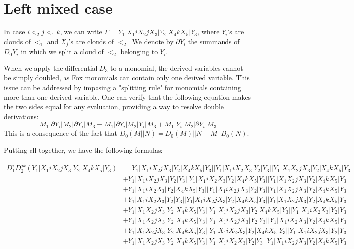 \documentclass{article}[12pt]
\begin{document}
\section*{Left mixed case}
In case $i<_2 j <_1 k$, we can write  $\Gamma = Y_1|X_1 i X_2 j X_3 |Y_2|X_4 k X_5 | Y_3$, where $Y_i$'s are clouds of $<_1$ and $X_j$'s are clouds of $<_2$. We denote by $\partial Y_i$ the summands of $D_0 Y_i$ in which we split a cloud of $<_2$ belonging to $Y_i$.

When we apply the differential $D_3$ to a monomial, the derived variables cannot be simply doubled, as Fox monomials can contain only one derived variable. This issue can be addressed by imposing a "splitting rule" for monomials containing more than one derived variable. One can verify that the following equation makes the two sides equal for any evaluation, providing a way to resolve double derivations:
$$ M_1|\partial Y_i | M_2 | \partial Y_i |M_3 = M_1|\partial Y_i | M_2 | Y_i |M_3 + M_1|Y_i | M_2 | \partial Y_i |M_3 $$
This is a consequence of the fact that $D_0(M||N)=D_0(M)||N + M||D_0(N)$. 

Putting all together, we have the following formulas:

\begin{align*}
D_1^iD_2^{jk}(Y_1|X_1iX_2jX_3|Y_2|X_4kX_5|Y_3)& =Y_1|X_1iX_2jX_3|Y_2|X_4kX_5|Y_3||Y_1|X_1iX_2X_3|Y_2|Y_3||Y_1|X_1X_2jX_3|Y_2|X_4kX_5|Y_3\\ 
 & +Y_1|X_1iX_2jX_3|Y_2|Y_3||Y_1|X_1iX_2X_3|Y_2|X_4kX_5|Y_3||Y_1|X_1X_2jX_3|Y_2|X_4kX_5|Y_3\\ 
 & +Y_1|X_1iX_2X_3|Y_2|X_4kX_5|Y_3||Y_1|X_1iX_2jX_3|Y_2|Y_3||Y_1|X_1X_2jX_3|Y_2|X_4kX_5|Y_3\\ 
 & +Y_1|X_1iX_2X_3|Y_2|Y_3||Y_1|X_1iX_2jX_3|Y_2|X_4kX_5|Y_3||Y_1|X_1X_2jX_3|Y_2|X_4kX_5|Y_3\\ 
 & +Y_1|X_1X_2jX_3|Y_2|X_4kX_5|Y_3||Y_1|X_1iX_2jX_3|Y_2|X_4kX_5|Y_3||Y_1|X_1iX_2X_3|Y_2|Y_3\\ 
 & +Y_1|X_1X_2jX_3|Y_2|X_4kX_5|Y_3||Y_1|X_1iX_2jX_3|Y_2|Y_3||Y_1|X_1iX_2X_3|Y_2|X_4kX_5|Y_3\\ 
 & +Y_1|X_1X_2jX_3|Y_2|X_4kX_5|Y_3||Y_1|X_1iX_2X_3|Y_2|X_4kX_5|Y_3||Y_1|X_1iX_2jX_3|Y_2|Y_3\\ 
 & +Y_1|X_1X_2jX_3|Y_2|X_4kX_5|Y_3||Y_1|X_1iX_2X_3|Y_2|Y_3||Y_1|X_1iX_2jX_3|Y_2|X_4kX_5|Y_3\end{align*}
\end{document}
